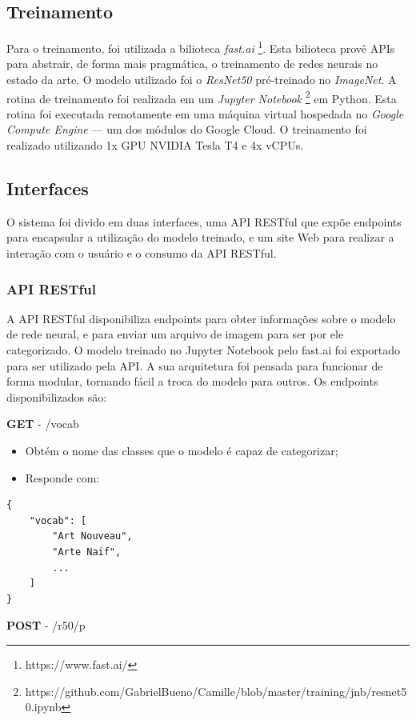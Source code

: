 \documentclass[12pt, a4paper]{article}
\begin{document}
\subsection{Treinamento}
Para o treinamento, foi utilizada a bilioteca \emph{fast.ai} \footnote{https://www.fast.ai/}. Esta bilioteca provê APIs para abstrair, de forma mais pragmática, o treinamento de redes neurais no estado da arte. O modelo utilizado foi o \emph{ResNet50} pré-treinado no \emph{ImageNet}. A rotina de treinamento foi realizada em um \emph{Jupyter Notebook} \footnote{https://github.com/GabrielBueno/Camille/blob/master/training/jnb/resnet50.ipynb} em Python. Esta rotina foi executada remotamente em uma máquina virtual hospedada no \emph{Google Compute Engine} --- um dos módulos do Google Cloud. O treinamento foi realizado utilizando 1x GPU NVIDIA Tesla T4 e 4x vCPUs.

\subsection{Interfaces}
O sistema foi divido em duas interfaces, uma API RESTful que expõe endpoints para encapsular a utilização do modelo treinado, e um site Web para realizar a interação com o usuário e o consumo da API RESTful.

\subsubsection{API RESTful}
A API RESTful disponibiliza endpoints para obter informações sobre o modelo de rede neural, e para enviar um arquivo de imagem para ser por ele categorizado. O modelo treinado no Jupyter Notebook pelo fast.ai foi exportado para ser utilizado pela API. A sua arquitetura foi pensada para funcionar de forma modular, tornando fácil a troca do modelo para outros. Os endpoints disponibilizados são:


\noindent
\textbf{GET} - /vocab

\begin{itemize}
\item Obtém o nome das classes que o modelo é capaz de categorizar;
\item Responde com:
\end{itemize}

\begin{lstlisting}
{
	"vocab": [
		"Art Nouveau", 
		"Arte Naif", 
		...
	]
}
\end{lstlisting}

\noindent
\textbf{POST} - /r50/p
\end{document}
